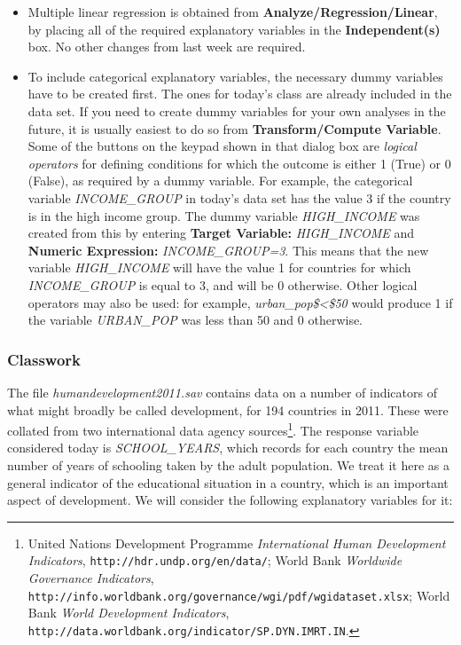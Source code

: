 \documentclass[11pt,a4paper,openany]{book}
\let\rmarkdownfootnote\footnote%
\def\footnote{\protect\rmarkdownfootnote}
\begin{document}
\begin{itemize}
\item
  Multiple linear regression is obtained from
  \textbf{Analyze/Regression/Linear}, by placing all of the required
  explanatory variables in the \textbf{Independent(s)} box. No other
  changes from last week are required.
\item
  To include categorical explanatory variables, the necessary dummy
  variables have to be created first. The ones for today's class are
  already included in the data set. If you need to create dummy
  variables for your own analyses in the future, it is usually easiest
  to do so from \textbf{Transform/Compute Variable}. Some of the buttons
  on the keypad shown in that dialog box are \emph{logical operators}
  for defining conditions for which the outcome is either 1 (True) or 0
  (False), as required by a dummy variable. For example, the categorical
  variable \emph{INCOME\_GROUP} in today's data set has the value 3 if
  the country is in the high income group. The dummy variable
  \emph{HIGH\_INCOME} was created from this by entering \textbf{Target
  Variable:} \emph{HIGH\_INCOME} and \textbf{Numeric Expression:}
  \emph{INCOME\_GROUP=3}. This means that the new variable
  \emph{HIGH\_INCOME} will have the value 1 for countries for which
  \emph{INCOME\_GROUP} is equal to 3, and will be 0 otherwise. Other
  logical operators may also be used: for example,
  \emph{urban\_pop\$\textless{}\$50} would produce 1 if the variable
  \emph{URBAN\_POP} was less than 50 and 0 otherwise.
\end{itemize}

\subsubsection*{Classwork}\label{classwork-5}

The file \emph{humandevelopment2011.sav} contains data on a number of
indicators of what might broadly be called development, for 194
countries in 2011. These were collated from two international data
agency sources\footnote{United Nations Development Programme
  \emph{International Human Development Indicators},
  \texttt{http://hdr.undp.org/en/data/}; World Bank \emph{Worldwide
  Governance Indicators},
  \texttt{http://info.worldbank.org/governance/wgi/pdf/wgidataset.xlsx};
  World Bank \emph{World Development Indicators},
  \texttt{http://data.worldbank.org/indicator/SP.DYN.IMRT.IN}.}. The
response variable considered today is \emph{SCHOOL\_YEARS}, which
records for each country the mean number of years of schooling taken by
the adult population. We treat it here as a general indicator of the
educational situation in a country, which is an important aspect of
development. We will consider the following explanatory variables for
it:
\end{document}
